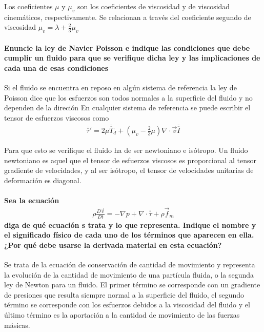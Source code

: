 \documentclass[a4paper]{article}
\begin{document}
Los coeficientes $\mu$ y $\mu_v$ son los coeficientes de viscosidad
y de viscosidad cinemáticos, respectivamente. Se relacionan a través
del coeficiente segundo de viscosidad $\mu_v = \lambda + \frac{2}{3}\mu_v$

\newpage
\paragraph{Enuncie la ley de Navier Poisson e indique las condiciones
que debe cumplir un fluido para que se verifique dicha ley y las 
implicaciones de cada una de esas condiciones} 

Si el fluido se encuentra en reposo en algún sistema de referencia
la ley de Poisson dice que los esfuerzos son todos normales a la
superficie del fluido y no dependen de la direción
En cualquier sistema de referencia se puede escribir el tensor
de esfuerzos viscosos como
\begin{align*}
	\overline{\overline{\tau}}' = 2\mu \overline{\overline{T}}_d + (\mu_v - \frac{2}{3}\mu) \nabla\cdot \vec{v} \overline{\overline{I}}
\end{align*}

Para que esto se verifique el fluido ha de ser newtoniano e isótropo.
Un fluido newtoniano es aquel que el tensor de esfuerzos viscosos es
proporcional al tensor gradiente de velocidades, y al ser isótropo,
el tensor de velocidades unitarias de deformación es diagonal.


\newpage
\paragraph{Sea la ecuación 
\begin{align*}
	\rho \frac{D \vec{v}}{Dt} = - \nabla p + \nabla \cdot \overline{\overline{\tau}} + \rho \vec{f}_m
\end{align*} 
diga de qué ecuación s trata y lo que representa. Indique el nombre y 
el significado físico de cada uno de los términos que aparecen en ella.
¿Por qué debe usarse la derivada material en esta ecuación?} 

Se trata de la ecuación de conservación de cantidad de movimiento y representa
la evolución de la cantidad de movimiento de una partícula fluida, 
o la segunda ley de Newton para un fluido.
El primer término se corresponde con un gradiente de presiones que 
resulta siempre normal a la superficie del fluido, el segundo 
término se corresponde con los esfuerzos debidos a la viscosidad
del fluido y el último término es la aportación a la cantidad de 
movimiento de las fuerzas másicas.
\end{document}
